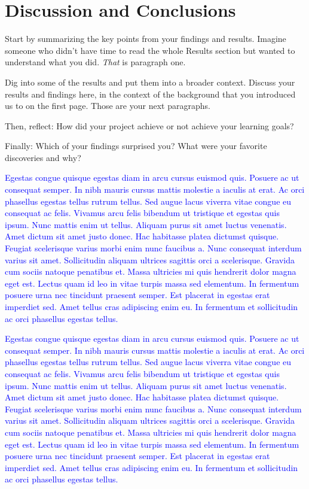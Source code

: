 \documentclass[%
 reprint,
superscriptaddress,
 amsmath,amssymb,
 aps,
]{revtex4-2}
\begin{document}
\section{Discussion and Conclusions}

Start by summarizing the key points from your findings and results. Imagine someone who didn't have time to read the whole Results section but wanted to understand what you did. {\it That} is paragraph one.

Dig into some of the results and put them into a broader context. Discuss your results and findings here, in the context of the background that you introduced us to on the first page. Those are your next paragraphs.

Then, reflect: How did your project achieve or not achieve your learning goals?

Finally: Which of your findings surprised you? What were your favorite discoveries and why? 

\textcolor{blue}{Egestas congue quisque egestas diam in arcu cursus euismod quis. Posuere ac ut consequat semper. In nibh mauris cursus mattis molestie a iaculis at erat. Ac orci phasellus egestas tellus rutrum tellus. Sed augue lacus viverra vitae congue eu consequat ac felis. Vivamus arcu felis bibendum ut tristique et egestas quis ipsum. Nunc mattis enim ut tellus. Aliquam purus sit amet luctus venenatis. Amet dictum sit amet justo donec. Hac habitasse platea dictumst quisque. Feugiat scelerisque varius morbi enim nunc faucibus a. Nunc consequat interdum varius sit amet. Sollicitudin aliquam ultrices sagittis orci a scelerisque. Gravida cum sociis natoque penatibus et. Massa ultricies mi quis hendrerit dolor magna eget est. Lectus quam id leo in vitae turpis massa sed elementum. In fermentum posuere urna nec tincidunt praesent semper. Est placerat in egestas erat imperdiet sed. Amet tellus cras adipiscing enim eu. In fermentum et sollicitudin ac orci phasellus egestas tellus.}



\textcolor{blue}{Egestas congue quisque egestas diam in arcu cursus euismod quis. Posuere ac ut consequat semper. In nibh mauris cursus mattis molestie a iaculis at erat. Ac orci phasellus egestas tellus rutrum tellus. Sed augue lacus viverra vitae congue eu consequat ac felis. Vivamus arcu felis bibendum ut tristique et egestas quis ipsum. Nunc mattis enim ut tellus. Aliquam purus sit amet luctus venenatis. Amet dictum sit amet justo donec. Hac habitasse platea dictumst quisque. Feugiat scelerisque varius morbi enim nunc faucibus a. Nunc consequat interdum varius sit amet. Sollicitudin aliquam ultrices sagittis orci a scelerisque. Gravida cum sociis natoque penatibus et. Massa ultricies mi quis hendrerit dolor magna eget est. Lectus quam id leo in vitae turpis massa sed elementum. In fermentum posuere urna nec tincidunt praesent semper. Est placerat in egestas erat imperdiet sed. Amet tellus cras adipiscing enim eu. In fermentum et sollicitudin ac orci phasellus egestas tellus.}
\end{document}
